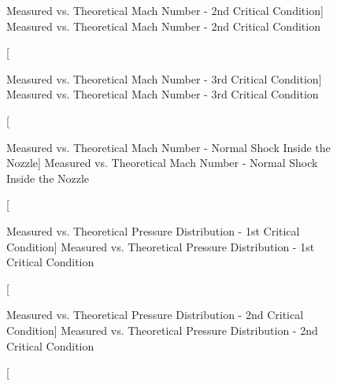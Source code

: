 \begin{figure}[htpb]
    \centering
     
     \caption
     [Measured vs. Theoretical Mach Number - 2nd Critical Condition]
     {Measured vs. Theoretical Mach Number - 2nd Critical Condition}
     \label{fig: MeasuredvsTheoreticalMachNumber2ndCriticalCondition}
\end{figure}

\begin{figure}[htpb]
    \centering
     
     \caption
     [Measured vs. Theoretical Mach Number - 3rd Critical Condition]
     {Measured vs. Theoretical Mach Number - 3rd Critical Condition}
     \label{fig: MeasuredvsTheoreticalMachNumber3rdCriticalCondition}
\end{figure}

\begin{figure}[htpb]
    \centering
     
     \caption
     [Measured vs. Theoretical Mach Number - Normal Shock Inside the Nozzle]
     {Measured vs. Theoretical Mach Number - Normal Shock Inside the Nozzle}
     \label{fig: MeasuredvsTheoreticalMachNumberNormalShockInsidetheNozzle}
\end{figure}

\begin{figure}[htpb]
    \centering
     
     \caption
     [Measured vs. Theoretical Pressure Distribution - 1st Critical Condition]
     {Measured vs. Theoretical Pressure Distribution - 1st Critical Condition}
     \label{fig: MeasuredvsTheoreticalPressureDistribution1stCriticalCondition}
\end{figure}

\begin{figure}[htpb]
    \centering
     
     \caption
     [Measured vs. Theoretical Pressure Distribution - 2nd Critical Condition]
     {Measured vs. Theoretical Pressure Distribution - 2nd Critical Condition}
     \label{fig: MeasuredvsTheoreticalPressureDistribution2ndCriticalCondition}
\end{figure}

